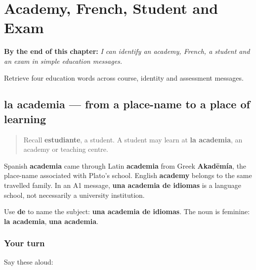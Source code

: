 
\chapter{Academy, French, Student and Exam}
\label{ch:academia-frances-estudiante-examen}

\begin{chapteropening}
\textbf{By the end of this chapter:} \emph{I can identify an academy, French, a student and an exam in simple education messages.}

Retrieve four education words across course, identity and assessment messages.
\end{chapteropening}

\section[la academia]{la academia — from a place-name to a place of learning}

\label{lesson:ES-C410-academia}



\begin{quote}
Recall \textbf{estudiante}, a student. A student may learn at \textbf{la academia}, an academy or teaching centre.
\end{quote}

\begin{cousinweb}
Spanish \textbf{academia} came through Latin \textbf{academia} from Greek \textbf{Akadēmía}, the place-name associated with Plato's school. English \textbf{academy} belongs to the same travelled family. In an A1 message, \textbf{una academia de idiomas} is a language school, not necessarily a university institution.
\end{cousinweb}

\begin{grammarlens}[title={Grammar Lens: what kind of academy?}]
Use \textbf{de} to name the subject: \textbf{una academia de idiomas}. The noun is feminine: \textbf{la academia}, \textbf{una academia}.
\end{grammarlens}

\subsection*{Your turn}
Say these aloud:

